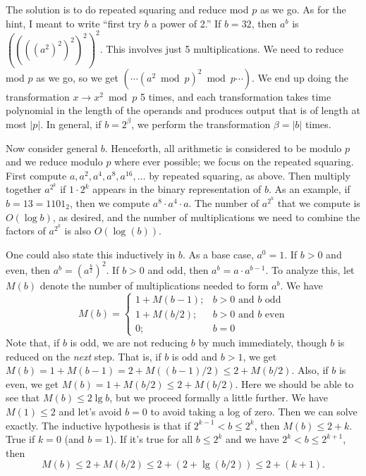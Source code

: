 \documentclass[2pt]{scrartcl}
\begin{document}
\begin{multicols}{6}
  The solution is to do repeated squaring and reduce mod $p$ as we go.
  As for the hint, I meant to write ``first try $b$ a power of 2.''  If
  $b=32$, then $a^b$ is $((((a^2)^2)^2)^2)^2$.  This involves just 5
  multiplications.  We need to reduce mod $p$ as we go, so we get
  $(\cdots(a^2\bmod p)^2\bmod p\cdots)$.  We end up doing the
  transformation $x\to x^2\bmod p$ 5 times, and each transformation
  takes time polynomial in the length of the operands and produces
  output that is of length at most $|p|$.  In general, if $b=2^\beta$,
  we perform the transformation $\beta=|b|$ times.

  Now consider general $b$.  Henceforth, all arithmetic is considered to
  be modulo $p$ and we reduce modulo $p$ where ever possible; we focus
  on the repeated squaring.  First compute $a,a^2,a^4,a^8,a^{16},\ldots$
  by repeated squaring, as above.  Then multiply together $a^{2^k}$ if
  $1\cdot 2^k$ appears in the binary representation of $b$.  As an
  example, if $b=13=1101_2$, then we compute $a^8\cdot a^4\cdot a$.  The
  number of $a^{2^k}$ that we compute is $O(\log b)$, as desired, and
  the number of multiplications we need to combine the factors of
  $a^{2^k}$ is also $O(\log(b))$.

  One could also state this inductively in $b$.  As a base case,
  $a^0=1$.  If $b>0$ and even, then
  $a^b=\left(a^{\frac b2}\right)^2$.  If $b>0$ and odd, then
  $a^b=a\cdot a^{b-1}$.  To analyze this, let $M(b)$ denote the number
  of multiplications needed to form $a^b$.  We have
  \[
    M(b)=
    \left\{
      \begin{array}{ll}
        1+M(b-1); & \mbox{$b>0$ and $b$ odd}\\
        1+M(b/2); & \mbox{$b>0$ and $b$ even}\\
               0; & \mbox{$b=0$}
      \end{array}
      \right.
    \]
    Note that, if $b$ is odd, we are not reducing $b$ by much immediately,
    though $b$ is reduced on the {\em next} step.  That is, if $b$ is odd
    and $b>1$, we get $M(b)=1+M(b-1)=2+M((b-1)/2)\le 2+M(b/2)$.  Also, if
    $b$ is even, we get $M(b)=1+M(b/2)\le2+M(b/2)$.  Here we should be
    able to see that $M(b)\le 2\lg b$, but we proceed formally a little
    further.  We have $M(1)\le 2$ and
    let's avoid $b=0$ to avoid taking a log of zero.  Then we can solve
    exactly.  The inductive hypothesis is that if $2^{k-1}<b\le 2^k$, then
    $M(b)\le 2+k$.  True if $k=0$ (and $b=1$).  If it's true for all $b\le
    2^k$ and we have $2^k<b\le 2^{k+1}$, then
    \[M(b)\le 2+M(b/2)\le2+(2+\lg(b/2))\le 2+(k+1).\]


\end{multicols}
\end{document}
